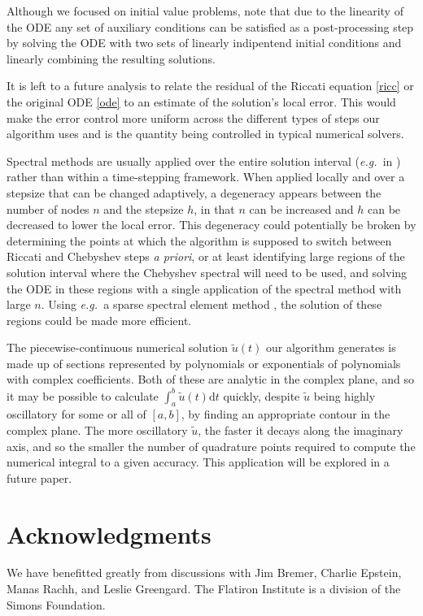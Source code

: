 \documentclass[10pt]{article}
\newcommand{\eg}{{\it e.g.\ }}
\begin{document}
Although we focused on initial value problems, note that due to the linearity
of the ODE any set of auxiliary conditions can be satisfied as a
post-processing step by solving the ODE with two sets of linearly indipentend
initial conditions and linearly combining the resulting solutions.

It is left to a future analysis to relate the residual of the Riccati equation
\cref{ricc} or the original ODE \cref{ode} to an estimate of the solution's
local error. This would make the error control more uniform across the
different types of steps our algorithm uses and is the quantity being
controlled in typical numerical solvers.  

Spectral methods are usually applied over the entire solution interval (\eg in
\cite{driscoll2008}) rather than within a time-stepping framework. When applied
locally and over a stepsize that can be changed adaptively, a degeneracy
appears between the number of nodes $n$ and the stepsize $h$, in that $n$ can
be increased and $h$ can be decreased to lower the local error. This degeneracy
could potentially be broken by determining the points at which the algorithm is
supposed to switch between Riccati and Chebyshev steps \emph{a priori}, or at
least identifying large regions of the solution interval where the Chebyshev
spectral will need to be used, and solving the ODE in these regions with a
single application of the spectral method with large $n$. Using \eg a sparse
spectral element method \cite{fortunato2021}, the solution of these regions
could be made more efficient.

The piecewise-continuous numerical solution $\tilde{u}(t)$ our algorithm generates is made up
of sections represented by polynomials or exponentials of polynomials with
complex coefficients. Both of these are analytic in the complex plane, and so
it may be possible to calculate $\int_a^b \tilde{u}(t)\mathrm{d}t$ quickly,
despite $\tilde{u}$ being highly oscillatory for some or all of $[a, b]$, by
finding an appropriate contour in the complex plane. The more oscillatory
$\tilde{u}$, the faster it decays along the imaginary axis, and so the smaller
the number of quadrature points required to compute the numerical integral to a
given accuracy. This application will be explored in a future paper.

\section*{Acknowledgments}
We have benefitted greatly from discussions with Jim Bremer, Charlie Epstein,
Manas Rachh, and Leslie Greengard.
The Flatiron Institute is a division of the Simons Foundation.
\end{document}
